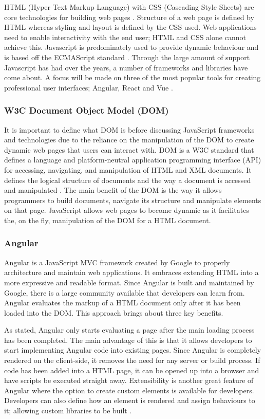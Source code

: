 HTML (Hyper Text Markup Language) with CSS (Cascading Style Sheets) are core technologies for building web pages \cite{w3c_html_css}.
Structure of a web page is defined by HTML whereas styling and layout is defined by the CSS used.
Web applications need to enable interactivity with the end user; HTML and CSS alone cannot achieve this.
Javascript is predominately used to provide dynamic behaviour and is based off the ECMAScript standard \cite{stefanov2010javascript}.
Through the large amount of support Javascript has had over the years, a number of frameworks and libraries have come about.
A focus will be made on three of the most popular tools for creating professional user interfaces; Angular, React and Vue \cite{stateofjs_2018}.

\subsubsection{W3C Document Object Model (DOM)}
It is important to define what DOM is before discussing JavaScript frameworks and technologies due to the reliance on the manipulation of the DOM to 
create dynamic web pages that users can interact with.
DOM is a W3C standard that defines a language and platform-neutral application programming interface (API) for accessing, navigating, and 
manipulation of HTML and XML documents.
It defines the logical structure of documents and the way a document is accessed and manipulated \cite{wood1999programming}.
The main benefit of the DOM is the way it allows programmers to build documents, navigate its structure and manipulate elements on that page.
JavaScript allows web pages to become dynamic as it facilitates the, on the fly, manipulation of the DOM for a HTML document.

\subsubsection{Angular}
Angular is a JavaScript MVC framework created by Google to properly architecture and maintain web applications.
It embraces extending HTML into a more expressive and readable format. 
Since Angular is built and maintained by Google, there is a large community available that developers can learn from.
Angular evaluates the markup of a HTML document only after it has been loaded into the DOM.
This approach brings about three key benefits.

As stated, Angular only starts evaluating a page after the main loading process has been completed.
The main advantage of this is that it allows developers to start implementing Angular code into existing pages.
Since Angular is completely rendered on the client-side, it removes the need for any server or build process. 
If code has been added into a HTML page, it can be opened up into a browser and have scripts be executed straight away.
Extensibility is another great feature of Angular where the option to create custom elements is available for developers.
Developers can also define how an element is rendered and assign behaviours to it; allowing custom libraries to be built \cite{jain2015angularjs}.

